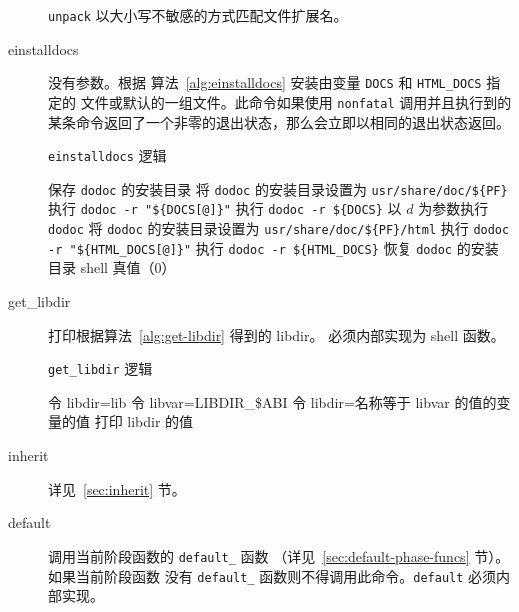 \begin{description}
    \texttt{unpack} 以大小写不敏感的方式匹配文件扩展名。

\item[einstalldocs] 没有参数。根据
    算法~\ref{alg:einstalldocs} 安装由变量 \texttt{DOCS} 和 \texttt{HTML_DOCS} 指定的
    文件或默认的一组文件。此命令如果使用 \texttt{nonfatal} 调用并且执行到的
    某条命令返回了一个非零的退出状态，那么会立即以相同的退出状态返回。

\begin{algorithm}[h]
\caption{\texttt{einstalldocs} 逻辑} \label{alg:einstalldocs}
\begin{algorithmic}[1]
\STATE 保存 \texttt{dodoc} 的安装目录
\STATE 将 \texttt{dodoc} 的安装目录设置为 \texttt{usr/share/doc/\$\{PF\}}
    \STATE 执行 \texttt{dodoc -r "\$\{DOCS[@]\}"}
    \STATE 执行 \texttt{dodoc -r \$\{DOCS\}}
            \STATE 以 $d$ 为参数执行 \texttt{dodoc}
        \ENDIF
    \ENDFOR
\ENDIF
\STATE 将 \texttt{dodoc} 的安装目录设置为 \texttt{usr/share/doc/\$\{PF\}/html}
    \STATE 执行 \texttt{dodoc -r "\$\{HTML_DOCS[@]\}"}
    \STATE 执行 \texttt{dodoc -r \$\{HTML_DOCS\}}
\ENDIF
\STATE 恢复 \texttt{dodoc} 的安装目录
\RETURN shell 真值（0）
\end{algorithmic}
\end{algorithm}

\item[get_libdir] 打印根据算法~\ref{alg:get-libdir} 得到的 libdir。
    必须内部实现为 shell 函数。

\begin{algorithm}[!h]
\caption{\texttt{get_libdir} 逻辑} \label{alg:get-libdir}
\begin{algorithmic}[1]
\STATE 令 libdir=lib
    \STATE 令 libvar=LIBDIR_\$ABI
        \STATE 令 libdir=\hspace{0em}名称等于 libvar 的值的变量的值
    \ENDIF
\ENDIF
\STATE 打印 libdir 的值
\end{algorithmic}
\end{algorithm}

\item[inherit] 详见~\ref{sec:inherit} 节。

\item[default]
    调用当前阶段函数的 \texttt{default_} 函数
    （详见~\ref{sec:default-phase-funcs} 节）。如果当前阶段函数
    没有 \texttt{default_} 函数则不得调用此命令。\texttt{default} 必须内部实现。

\end{description}

